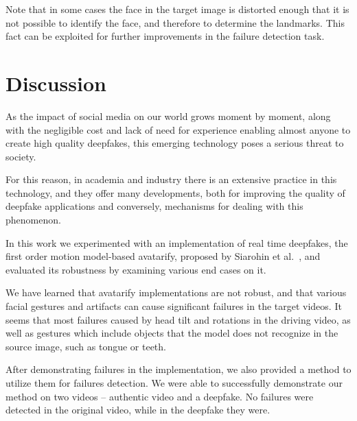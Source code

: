 \documentclass[english,12pt]{article}
\begin{document}
Note that in some cases the face in the target image is distorted enough that it is not possible to identify the face,
and therefore to determine the landmarks. This fact can be exploited for further improvements in the failure detection task.



\section{Discussion} \label{discussion}

As the impact of social media on our world grows moment by moment, along with the negligible cost
and lack of need for experience enabling almost anyone to create high quality deepfakes, this
emerging technology poses a serious threat to society.

For this reason, in academia and industry there is an extensive practice in this technology, and
they offer many developments, both for improving the quality of deepfake applications and conversely,
mechanisms for dealing with this phenomenon.

In this work we experimented with an implementation of real time deepfakes, the first order motion
model-based avatarify, proposed by Siarohin et al.~\cite{DBLP:journals/corr/abs-2003-00196}, and
evaluated its robustness by examining various end cases on it.

We have learned that avatarify implementations are not robust, and that various facial gestures
and artifacts can cause significant failures in the target videos. It seems that most failures
caused by head tilt and rotations in the driving video, as well as gestures which include objects
that the model does not recognize in the source image, such as tongue or teeth.

After demonstrating failures in the implementation, we also provided a method to utilize them for
failures detection. We were able to successfully demonstrate our method on two videos -- authentic
video and a deepfake. No failures were detected in the original video, while in the
deepfake they were.


\pagebreak{}
\pagebreak{}



\end{document}
